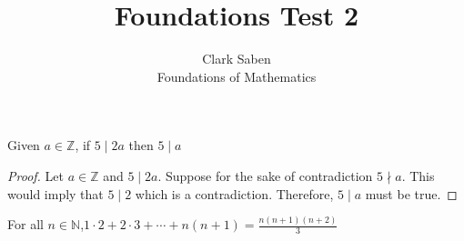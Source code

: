 \documentclass[12pt]{article}
\newenvironment{theorem}[2][Theorem]{\begin{trivlist}
\item[\hskip \labelsep {\bfseries #1}\hskip \labelsep {\bfseries #2.}]}{\end{trivlist}}
\begin{document}
 
 
\title{Foundations Test 2}%
\author{Clark Saben\\ %
Foundations of Mathematics} %
 
\maketitle

\section{}
\begin{theorem}1
	Given $a \in \mathbb{Z}$, if $5\mid2a$ then $5\mid a$
\end{theorem}
\begin{proof}
	Let $a \in \mathbb{Z}$ and $5\mid2a$. Suppose for the sake of
	contradiction $5\nmid a$. This would imply that $5\mid2$ which
	is a contradiction. Therefore, $5\mid a$ must be true.
\end{proof}
\begin{theorem}{3}
	For all $n \in \mathbb{N}$,$ 1\cdot2 + 2\cdot3 + \cdots + n(n+1) = \frac{n(n+1)(n+2)}{3}$
\end{theorem}
\end{document}
